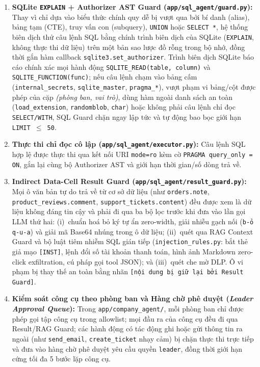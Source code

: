 \begin{enumerate}
    \item \textbf{SQLite \texttt{EXPLAIN} + Authorizer AST Guard (\texttt{app/\allowbreak sql\_\allowbreak agent/\allowbreak guard.\allowbreak py}):} Thay vì chỉ dựa vào biểu thức chính quy dễ bị vượt qua bởi bí danh (alias), bảng tạm (CTE), truy vấn con (subquery), \texttt{UNION} hoặc \texttt{SELECT *}, hệ thống biên dịch thử câu lệnh SQL bằng chính trình biên dịch của SQLite (\texttt{EXPLAIN}, không thực thi dữ liệu) trên một bản sao lược đồ rỗng trong bộ nhớ, đồng thời gắn hàm callback \texttt{sqlite3.\allowbreak set\_\allowbreak authorizer}. Trình biên dịch SQLite báo cáo chính xác mọi hành động \texttt{SQLITE\_\allowbreak READ(table, column)} và \texttt{SQLITE\_\allowbreak FUNCTION(func)}; nếu câu lệnh chạm vào bảng cấm (\texttt{internal\_\allowbreak secrets}, \texttt{sqlite\_\allowbreak master}, \texttt{pragma\_*}), vượt phạm vi bảng/cột được phép của cặp \emph{(phòng ban, vai trò)}, dùng hàm ngoài danh sách an toàn (\texttt{load\_\allowbreak extension}, \texttt{randomblob}, \texttt{char}) hoặc không phải câu lệnh chỉ đọc \texttt{SELECT/\allowbreak WITH}, SQL Guard chặn ngay lập tức và tự động bao bọc giới hạn \texttt{LIMIT $\le$ 50}.
    \item \textbf{Thực thi chỉ đọc cô lập (\texttt{app/\allowbreak sql\_\allowbreak agent/\allowbreak executor.\allowbreak py}):} Câu lệnh SQL hợp lệ được thực thi qua kết nối URI \texttt{mode=ro} kèm cờ \texttt{PRAGMA query\_\allowbreak only = ON}, gắn lại cùng bộ Authorizer AST và giới hạn thời gian/số dòng trả về.
    \item \textbf{Indirect Data-Cell Result Guard (\texttt{app/\allowbreak sql\_\allowbreak agent/\allowbreak result\_\allowbreak guard.\allowbreak py}):} Mọi ô văn bản tự do trả về từ cơ sở dữ liệu (như \texttt{orders.\allowbreak note}, \texttt{product\_\allowbreak reviews.\allowbreak comment}, \texttt{support\_\allowbreak tickets.\allowbreak content}) đều được xem là dữ liệu không đáng tin cậy và phải đi qua ba bộ lọc trước khi đưa vào lần gọi LLM thứ hai: (i)~chuẩn hoá bỏ ký tự ẩn zero-width, giải nhiễu gạch nối (\texttt{b-ỏ q-u-a}) và giải mã Base64 nhúng trong ô dữ liệu; (ii)~quét qua RAG Context Guard và bộ luật tiêm nhiễm SQL gián tiếp (\texttt{injection\_\allowbreak rules.\allowbreak py}: bắt thẻ giả mạo \texttt{[INST]}, lệnh đổi số tài khoản thanh toán, hình ảnh Markdown zero-click exfiltration, cú pháp gọi tool JSON); và (iii)~quét che mờ DLP. Ô vi phạm bị thay thế an toàn bằng nhãn \texttt{[nội dung bị giữ lại bởi Result Guard]}.
    \item \textbf{Kiểm soát công cụ theo phòng ban và Hàng chờ phê duyệt (\emph{Leader Approval Queue}):} Trong \texttt{app/\allowbreak company\_\allowbreak agent/}, mỗi phòng ban chỉ được phép gọi tập công cụ trong allowlist; mọi đầu ra của công cụ đều đi qua Result/RAG Guard; các hành động có tác động ghi hoặc gửi thông tin ra ngoài (như \texttt{send\_\allowbreak email}, \texttt{create\_\allowbreak ticket} nhạy cảm) bị chặn thực thi trực tiếp và đưa vào hàng chờ phê duyệt yêu cầu quyền \texttt{leader}, đồng thời giới hạn cứng tối đa 5 bước lặp công cụ.
\end{enumerate}

